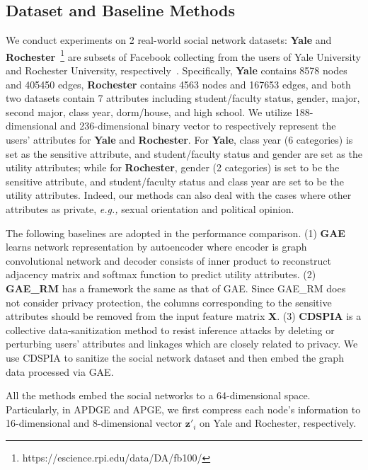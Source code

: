 \documentclass{article}
\begin{document}
\subsection{Dataset and Baseline Methods}
We conduct experiments on 2 real-world social network datasets:
\textbf{Yale} and \textbf{Rochester}~\footnote{https://escience.rpi.edu/data/DA/fb100/} are subsets of Facebook collecting from the users of Yale University and Rochester University, respectively~\citep{traud2012social}. Specifically, \textbf{Yale} contains 8578 nodes and 405450 edges, \textbf{Rochester} contains 4563 nodes and 167653 edges, and both two datasets contain 7 attributes including student/faculty status, gender, major, second major, class year, dorm/house, and high school. We utilize 188-dimensional and 236-dimensional binary vector to respectively represent the users' attributes for \textbf{Yale} and \textbf{Rochester}. For \textbf{Yale}, class year (6 categories) is set as the sensitive attribute, and student/faculty status and gender are set as the utility attributes; while for \textbf{Rochester}, gender (2 categories) is set to be the sensitive attribute, and student/faculty status and class year are set to be the utility attributes. Indeed, our methods can also deal with the cases where other attributes as private, {\em e.g.,} sexual orientation and political opinion.%


The following baselines are adopted in the performance comparison.
(1) \textbf{GAE} \citep{kipf2016variational} learns network representation by autoencoder where encoder is graph convolutional network and decoder consists of inner product to reconstruct adjacency matrix and softmax function to predict utility attributes.
(2) \textbf{GAE\_RM} \citep{kipf2016variational} has a framework the same as that of GAE. Since GAE\_RM does not consider privacy protection, the columns corresponding to the sensitive attributes should be removed from the input feature matrix $\mathbf{X}$.
(3) \textbf{CDSPIA} \citep{cai2018collective} is a collective data-sanitization method to resist inference attacks by deleting or perturbing users' attributes and linkages which are closely related to privacy. We use CDSPIA to sanitize the social network dataset and then embed the graph data processed via GAE.


All the methods embed the social networks to a 64-dimensional space. Particularly, in APDGE and APGE, we first compress each node's information to 16-dimensional and 8-dimensional vector $\mathbf{z}'_i$ on Yale and Rochester, respectively.
\end{document}
